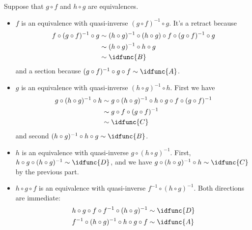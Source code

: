  \soln
Suppose that $g \circ f$ and $h \circ g$ are equivalences.



\begin{itemize}
\item  $f$ is an equivalence with quasi-inverse $(g \circ f)^{-1} \circ g$.  It's a
   retract because
   \begin{align*}
     f \circ (g \circ f)^{-1} \circ g
     &\sim
     (h \circ g)^{-1} \circ (h \circ g) \circ f \circ (g \circ f)^{-1} \circ g
     \\&\sim
     (h \circ g)^{-1} \circ h \circ g
     \\&\sim
     \idfunc{B}
   \end{align*}
   and a section because $(g \circ f)^{-1} \circ g \circ f \sim \idfunc{A}$.



\item  $g$ is an equivalence with quasi-inverse $(h \circ g)^{-1} \circ h$.  First
   we have
   \begin{align*}
     g \circ (h \circ g)^{-1} \circ h
     &\sim
     g \circ (h \circ g)^{-1} \circ h \circ g \circ f \circ (g \circ f)^{-1}
     \\&\sim
     g \circ f \circ (g \circ f)^{-1}
     \\&\sim
     \idfunc{C}
   \end{align*}
   and second $(h \circ g)^{-1} \circ h \circ g \sim \idfunc{B}$.



\item  $h$ is an equivalence with quasi-inverse $g \circ (h \circ g)^{-1}$.  First,
   $h \circ g \circ (h \circ g)^{-1} \sim \idfunc{D}$, and we have
   $g \circ (h \circ g)^{-1} \circ h \sim \idfunc{C}$ by the previous part.



\item  $h \circ g \circ f$ is an equivalence with quasi-inverse $f^{-1} \circ (h
   \circ g)^{-1}$.  Both directions are immediate:
   \begin{align*}
     h \circ g \circ f \circ f^{-1} \circ (h \circ g)^{-1} &\sim \idfunc{D} \\
     f^{-1} \circ (h \circ g)^{-1} \circ h \circ g \circ f &\sim \idfunc{A}
   \end{align*}

\end{itemize}




